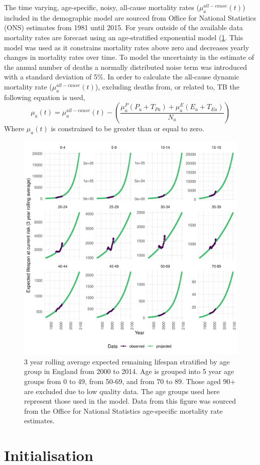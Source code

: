\documentclass[11pt,twoside]{bristolthesis}
\begin{document}
  The time varying, age-specific, noisy, all-cause mortality rates (\(\mu^{all-cause}_a(t)\)) included in the demographic model are sourced from Office for National Statistics (ONS) estimates from 1981 until 2015. For years outside of the available data mortality rates are forecast using an age-stratified exponential model (\ref{fig:mortality-england}. This model was used as it constrains mortality rates above zero and decreases yearly changes in mortality rates over time. To model the uncertainty in the estimate of the annual number of deaths a normally distributed noise term was introduced with a standard deviation of 5\%. In order to calculate the all-cause dynamic mortality rate (\(\mu^{all-cause}_a(t)\)), excluding deaths from, or related to, TB the following equation is used,
  \begin{equation}
  \mu_a(t) = \mu^{all-cause}_a(t) - \left(\frac{\mu^P_a(P_a + T_{Pa}) + \mu^E_a(E_a + T_{Ea})}{N_a}\right)
    \label{eq:adjusted-mortality}
  \end{equation}
  Where \(\mu_a(t)\) is constrained to be greater than or equal to zero.
  \begin{figure}
  
  {\centering \includegraphics[width=0.8\linewidth]{chapters/model-development/resources/figure/mortality} 
  
  }
  
  \caption{3 year rolling average expected remaining lifespan stratified by age group in England from 2000 to 2014. Age is grouped into 5 year age groups from 0 to 49, from 50-69, and from 70 to 89. Those aged 90+ are excluded due to low quality data. The age groups used here represent those used in the model. Data from this figure was sourced from the Office for National Statistics age-specific mortality rate estimates.}\label{fig:mortality-england}
  \end{figure}
  \hypertarget{initialisation}{%
  \section{Initialisation}\label{initialisation}}
  
\end{document}
